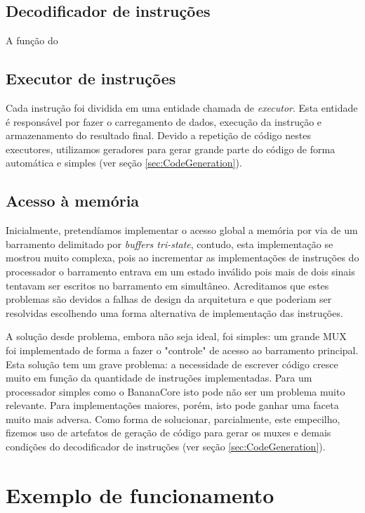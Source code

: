 \documentclass[11pt]{report}
\begin{document}
\subsection{Decodificador de instruções}
\label{sec:InstructionDecoder}
A função do 

\subsection{Executor de instruções}
\label{sec:InstructionExecutor}
Cada instrução foi dividida em uma entidade chamada de \emph{executor}. Esta entidade é responsável por fazer o carregamento de dados, execução da instrução e armazenamento do resultado final. Devido a repetição de código nestes executores, utilizamos geradores para gerar grande parte do código de forma automática e simples (ver seção \ref{sec:CodeGeneration}).

\subsection{Acesso à memória}
\label{sec:MemoryAccess}

Inicialmente, pretendíamos implementar o acesso global a memória por via de um barramento delimitado por \emph{buffers tri-state}, contudo, esta implementação se mostrou muito complexa, pois ao incrementar as implementações de instruções do processador o barramento entrava em um estado inválido pois mais de dois sinais tentavam ser escritos no barramento em simultâneo. Acreditamos que estes problemas são devidos a falhas de design da arquitetura e que poderiam ser resolvidas escolhendo uma forma alternativa de implementação das instruções.

A solução desde problema, embora não seja ideal, foi simples: um grande MUX foi implementado de forma a fazer o "controle" de acesso ao barramento principal. Esta solução tem um grave problema: a necessidade de escrever código cresce muito em função da quantidade de instruções implementadas. Para um processador simples como o BananaCore isto pode não ser um problema muito relevante. Para implementações maiores, porém, isto pode ganhar uma faceta muito mais adversa. Como forma de solucionar, parcialmente, este empecilho, fizemos uso de artefatos de geração de código para gerar os muxes e demais condições do decodificador de instruções (ver seção \ref{sec:CodeGeneration}).

\section{Exemplo de funcionamento}
\end{document}
